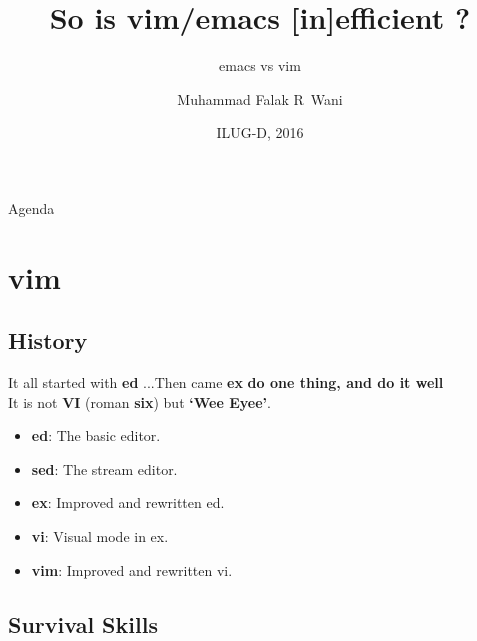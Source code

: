 \documentclass{beamer}
\title{So is vim/emacs [in]efficient ?}
\subtitle{emacs vs vim}
\author{Muhammad Falak R~Wani }
\institute[IIIT-D] %
{
	\inst{}
  Department of Computer Science\\
  IIIT-D
}
\date{ILUG-D, 2016}
\begin{document}
\begin{frame}
	\titlepage
\end{frame}

\begin{frame}{Agenda}
	\tableofcontents
\end{frame}

\section{vim}

\subsection{History}

\begin{frame}{It all started with \textbf{ed} ...}{Then came \textbf{ex}}
	\textbf{do one thing, and do it well}\\ 
	\pause
	It is not \textbf{VI} (roman \textbf{six}) but \textbf{`Wee Eyee'}.\\
	\pause
	\begin{itemize}
		\item {
				\textbf{ed}: The basic editor.
				\pause

			}
		\item {
				\textbf{sed}: The stream editor.
				\pause

			}
		\item {
				\textbf{ex}: Improved and rewritten ed.
				\pause
			}
		\item {
				\textbf{vi}: Visual mode in ex.
				\pause
			}
		\item {
				\textbf{vim}: Improved and rewritten vi.

			}
	\end{itemize}
\end{frame}

\subsection{Survival Skills}
\end{document}
